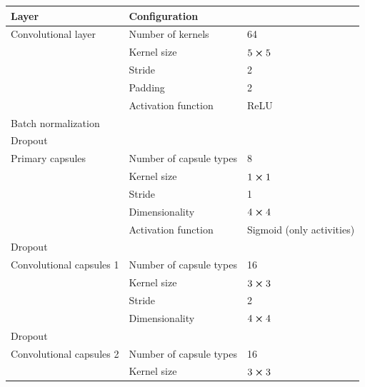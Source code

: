 \begin{table}[H]
\centering
\begin{tabular}{@{}lll@{}}
\toprule
Layer                    & \multicolumn{2}{l}{Configuration}                   \\ \midrule
Convolutional layer      & Number of kernels       & 64                        \\
                         & Kernel size             & $5\cross 5$               \\
                         & Stride                  & 2                         \\
                         & Padding                 & 2                         \\
                         & Activation function     & ReLU                      \\
Batch normalization      &                         &                           \\
Dropout                  &                         &                           \\
Primary capsules         & Number of capsule types & 8                         \\
                         & Kernel size             & $1\cross 1$               \\
                         & Stride                  & 1                         \\
                         & Dimensionality          & $4\cross 4$               \\
                         & Activation function     & Sigmoid (only activities) \\
Dropout                  &                         &                           \\
Convolutional capsules 1 & Number of capsule types & 16                        \\
                         & Kernel size             & $3\cross 3$               \\
                         & Stride                  & 2                         \\
                         & Dimensionality          & $4\cross 4$               \\
Dropout                  &                         &                           \\
Convolutional capsules 2 & Number of capsule types & 16                        \\
                         & Kernel size             & $3\cross 3$               \\

\end{tabular}
\end{table}
